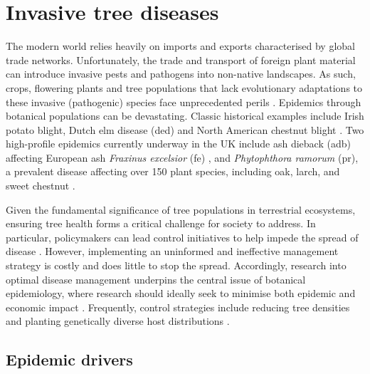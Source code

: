 \section{Invasive tree diseases}

The modern world relies heavily on imports and exports characterised by global trade networks. 
Unfortunately, the trade and transport of foreign plant material can introduce invasive pests and pathogens into non-native landscapes. 
As such, crops, flowering plants and tree populations that lack evolutionary adaptations 
to these invasive (pathogenic) species face unprecedented perils \cite{doi:10.1002/9781444329988.ch8}.
Epidemics through botanical populations can be devastating.
Classic historical examples include Irish potato blight, Dutch elm disease (\acrshort{ded}) \cite{doi:10.1111/j.1365-3059.2010.02391.x} 
and North American chestnut blight \cite{doi:10.1002/9780470535486.ch7}.
Two high-profile epidemics currently underway in the UK include ash dieback (\acrshort{adb}) affecting European ash \textit{Fraxinus excelsior} (\acrshort{fe})
\cite{ash-dieback-costs}, and \textit{Phytophthora ramorum} (\acrshort{pr}), a prevalent disease affecting over 150 plant species, including oak, 
larch, and sweet chestnut \cite{p.ramourum}.

Given the fundamental significance of tree populations in terrestrial ecosystems, ensuring tree health forms a critical challenge for society to address.
In particular, policymakers can lead control initiatives to help impede the spread of disease \cite{Gilligan-disease-management}.
However, implementing an uninformed and ineffective management strategy is costly and does little to stop the spread.
Accordingly, research into optimal disease management underpins the central issue of botanical epidemiology, 
where research should ideally seek to minimise both epidemic and economic impact \cite{ash-dieback-costs, freer2017tree, boyd2013consequence, tyrvainen2005benefits}. 
Frequently, control strategies include reducing tree densities \cite{pietzsch2021effect, resiliency-density-reductions} and planting genetically diverse host distributions \cite{doi:10.1094/PD-89-0969, genetic-heterogeneity, huang1980importance}.

\subsection{Epidemic drivers}

